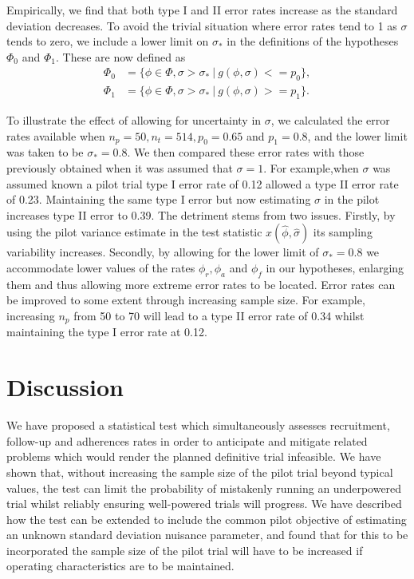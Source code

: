 \documentclass{article}
\begin{document}
Empirically, we find that both type I and II error rates increase as the standard deviation decreases. To avoid the trivial situation where error rates tend to 1 as $\sigma$ tends to zero, we include a lower limit on $\sigma_*$ in the definitions of the hypotheses $\Phi_0$ and $\Phi_1$. These are now defined as
\begin{align*}
\Phi_0 &= \{\phi \in \Phi, \sigma > \sigma_*  ~ | ~ g(\phi, \sigma) <= p_0 \}, \\
\Phi_1 &= \{\phi \in \Phi, \sigma > \sigma_* ~ | ~ g(\phi, \sigma) >= p_1 \}.
\end{align*}

To illustrate the effect of allowing for uncertainty in $\sigma$, we calculated the error rates available when $n_p = 50, n_t = 514, p_0 = 0.65$ and $p_1 = 0.8$, and the lower limit was taken to be $\sigma_* = 0.8$. We then compared these error rates with those previously obtained when it was assumed that $\sigma = 1$. For example,when $\sigma$ was assumed known a pilot trial type I error rate of 0.12 allowed a type II error rate of 0.23. Maintaining the same type I error but now estimating $\sigma$ in the pilot increases type II error to 0.39. The detriment stems from two issues. Firstly, by using the pilot variance estimate in the test statistic $x(\hat{\phi}, \hat{\sigma})$ its sampling variability increases. Secondly, by allowing for the lower limit of $\sigma_* = 0.8$ we accommodate lower values of the rates $\phi_r, \phi_a$ and $\phi_f$ in our hypotheses, enlarging them and thus allowing more extreme error rates to be located. Error rates can be improved to some extent through increasing sample size. For example, increasing $n_p$ from 50 to 70 will lead to a type II error rate of 0.34 whilst maintaining the type I error rate at 0.12.


\section{Discussion}\label{sec:discussion}

We have proposed a statistical test which simultaneously assesses recruitment, follow-up and adherences rates in order to anticipate and mitigate related problems which would render the planned definitive trial infeasible. We have shown that, without increasing the sample size of the pilot trial beyond typical values, the test can limit the probability of mistakenly running an underpowered trial whilst reliably ensuring well-powered trials will progress. We have described how the test can be extended to include the common pilot objective of estimating an unknown standard deviation nuisance parameter, and found that for this to be incorporated the sample size of the pilot trial will have to be increased if operating characteristics are to be maintained. 
\end{document}
